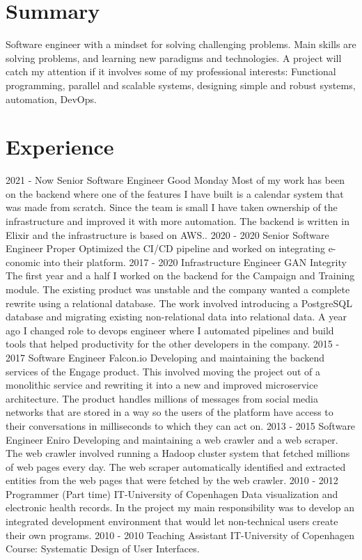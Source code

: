 \documentclass[]{friggeri-cv}
\begin{document}
\section{Summary}
Software engineer with a mindset for solving challenging problems. Main skills are solving problems, and learning new paradigms and technologies. A project will catch my attention if it involves some of my professional interests: Functional programming, parallel and scalable systems, designing simple and robust systems, automation, DevOps.

\section{Experience}
\begin{entrylist}
    \entry
    {2021 - Now}
    {Senior Software Engineer}
    {Good Monday}
    {Most of my work has been on the backend where one of the features I have built is a calendar system that was made from scratch. Since the team is small I have taken ownership of the infrastructure and improved it with more automation. The backend is written in Elixir and the infrastructure is based on AWS..}
    \entry
    {2020 - 2020}
    {Senior Software Engineer}
    {Proper}
    {Optimized the CI/CD pipeline and worked on integrating e-conomic into their platform.}
    \entry
    {2017 - 2020}
    {Infrastructure Engineer}
    {GAN Integrity}
    {The first year and a half I worked on the backend for the Campaign and Training module. The existing product was unstable and the company wanted a complete rewrite using a relational database.  
    The work involved introducing a PostgreSQL database and migrating existing non-relational data into relational data.
    A year ago I changed role to devops engineer where I automated pipelines and build tools that helped productivity for the other developers in the company.}
    \entry
    {2015 - 2017}
    {Software Engineer}
    {Falcon.io}
    {Developing and maintaining the backend services of the Engage product. This involved moving the project out of a monolithic service and rewriting it into a new and improved microservice architecture. The product handles millions of messages from social media networks that are stored in a way so the users of the platform have access to their conversations in milliseconds to which they can act on.}
    \entry
    {2013 - 2015}
    {Software Engineer}
    {Eniro}
    {Developing and maintaining a web crawler and a web scraper. The web crawler involved running a Hadoop cluster system that fetched millions of web pages every day. The web scraper automatically identified and extracted entities from the web pages that were fetched by the web crawler.}
    \entry
    {2010 - 2012}
    {Programmer (Part time)}
    {IT-University of Copenhagen}
    {Data visualization and electronic health records. In the project my main responsibility was to develop an integrated development environment that would let non-technical users create their own programs.}
    \entry
    {2010 - 2010}
    {Teaching Assistant}
    {IT-University of Copenhagen}
    {Course: Systematic Design of User Interfaces.}
\end{entrylist}
\\
\end{document}
